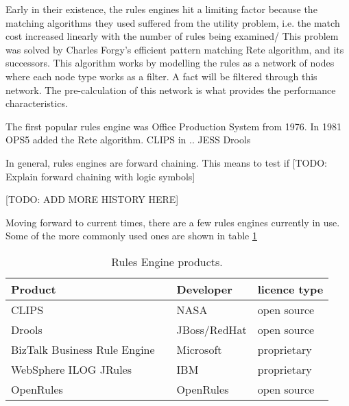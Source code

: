 Early in their existence, the rules engines hit a limiting factor because the matching algorithms they used suffered from the utility problem, i.e. the match cost increased linearly with the number of rules being examined/
This problem was solved by Charles Forgy's efficient pattern matching Rete algorithm\cite{forgy1989rete}, and its successors.
This algorithm works by modelling the rules as a network of nodes where each node type works as a filter. 
A fact will be filtered through this network.
The pre-calculation of this network is what provides the performance characteristics.

The first popular rules engine was Office Production System from 1976. 
In 1981 OPS5 added the Rete algorithm.
CLIPS in  ..
JESS
Drools 



In general, rules engines are forward chaining.  This means to test if 
[TODO: Explain forward chaining with logic symbols] 

[TODO: ADD MORE HISTORY HERE]

Moving forward to current times, there are a few rules engines currently in use.
Some of the more commonly used ones are shown in table \ref{table:RuleEngines}

\begin{table}
    \begin{center}
        \begin{tabular}{ |l c |l|l| } 
            \hline
            Product                      &                             & Developer    & licence type   \\
            \hline
            CLIPS                        & \cite{CLIPSProductPage}     & NASA         & open source    \\ 
            Drools                       & \cite{DroolsProductPage}    & JBoss/RedHat & open source    \\ 
            BizTalk Business Rule Engine & \cite{BiztalkProductPage}   & Microsoft    & proprietary    \\ 
            WebSphere ILOG JRules        & \cite{JRulesProductPage}    & IBM          & proprietary    \\ 
            OpenRules                    & \cite{OpenRulesProductPage} & OpenRules    & open source    \\ 
            \hline
        \end{tabular}
    \end{center}
    \caption{Rules Engine products.}
    \label{table:RuleEngines}
\end{table}

